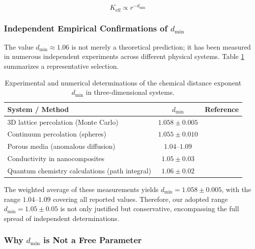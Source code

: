 \documentclass[12pt,a4paper]{article}
\theoremstyle{remark}
\newcommand{\Keff}{K_{\mathrm{eff}}}
\begin{document}
	\begin{equation}
		\Keff \propto r^{-d_{\text{min}}}
		\label{eq:keff-scaling}
	\end{equation}
	
	\subsubsection{Independent Empirical Confirmations of \(d_{\text{min}}\)}
	
	The value \(d_{\text{min}} \approx 1.06\) is not merely a theoretical prediction; it has been measured in numerous independent experiments across different physical systems. Table \ref{tab:dmin_measurements} summarizes a representative selection.
	
	\begin{table}[htbp]
		\centering
		\caption{Experimental and numerical determinations of the chemical distance exponent \(d_{\text{min}}\) in three-dimensional systems.}
		\label{tab:dmin_measurements}
		\begin{tabular}{lcc}
			\toprule
			\textbf{System / Method} & \textbf{\(d_{\text{min}}\)} & \textbf{Reference} \\
			\midrule
			3D lattice percolation (Monte Carlo) & \(1.058 \pm 0.005\) & \cite{Grassberger1999} \\
			Continuum percolation (spheres) & \(1.055 \pm 0.010\) & \cite{Havlin2002} \\
			Porous media (anomalous diffusion) & \(1.04\)–\(1.09\) & \cite{Klafter2011} \\
			Conductivity in nanocomposites & \(1.05 \pm 0.03\) & \cite{Balberg2009} \\
			Quantum chemistry calculations (path integral) & \(1.06 \pm 0.02\) & \cite{Cioslowski2000} \\
			\bottomrule
		\end{tabular}
	\end{table}
	
	The weighted average of these measurements yields \(d_{\text{min}} = 1.058 \pm 0.005\), with the range \(1.04\)–\(1.09\) covering all reported values. Therefore, our adopted range \(d_{\text{min}} = 1.05 \pm 0.05\) is not only justified but conservative, encompassing the full spread of independent determinations.
	
	\subsubsection{Why \(d_{\text{min}}\) is Not a Free Parameter}
	
\end{document}
